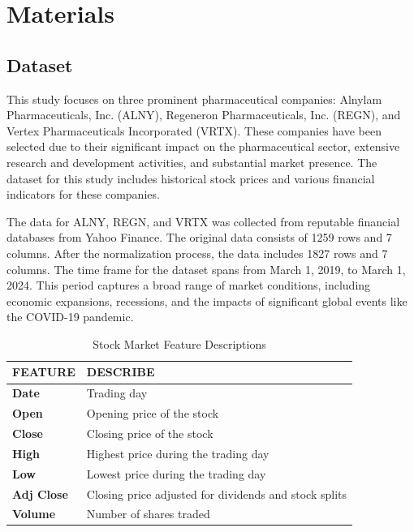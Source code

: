 \documentclass{ieeeojies}
\begin{document}
\section{Materials}
\subsection{Dataset}
\hspace{1em}This study focuses on three prominent pharmaceutical companies: Alnylam Pharmaceuticals, Inc. (ALNY), Regeneron Pharmaceuticals, Inc. (REGN), and Vertex Pharmaceuticals Incorporated (VRTX). These companies have been selected due to their significant impact on the pharmaceutical sector, extensive research and development activities, and substantial market presence. The dataset for this study includes historical stock prices and various financial indicators for these companies.

The data for ALNY, REGN, and VRTX was collected from reputable financial databases from Yahoo Finance. The original data consists of 1259 rows and 7 columns. After the normalization process, the data includes 1827 rows and 7 columns. The time frame for the dataset spans from March 1, 2019, to March 1, 2024. This period captures a broad range of market conditions, including economic expansions, recessions, and the impacts of significant global events like the COVID-19 pandemic. 

\begin{table}[H]
  \centering
  \caption{Stock Market Feature Descriptions}
  \begin{tabular}{|>{\bfseries}l|l|}
    \hline
    \rowcolor{red!20} FEATURE & DESCRIBE \\ \hline
    Date & Trading day \\ \hline
    Open & Opening price of the stock \\ \hline
    Close & Closing price of the stock \\ \hline
    High & Highest price during the trading day \\ \hline
    Low & Lowest price during the trading day \\ \hline
    Adj Close & Closing price adjusted for dividends and stock splits \\ \hline
    Volume & Number of shares traded \\ \hline
  \end{tabular}
\end{table}
\end{document}
